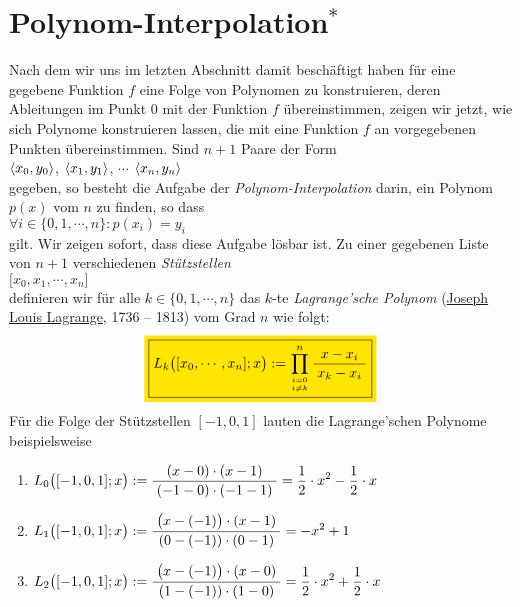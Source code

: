 \section{Polynom-Interpolation$^*$}
Nach dem wir uns im letzten Abschnitt damit besch\"aftigt haben f\"ur eine gegebene Funktion
$f$ eine Folge von Polynomen zu konstruieren, deren Ableitungen im Punkt $0$ mit der
Funktion $f$ \"ubereinstimmen, zeigen wir jetzt, wie sich Polynome konstruieren lassen, die
mit eine Funktion $f$ an vorgegebenen Punkten \"ubereinstimmen.  Sind $n+1$ Paare der Form
\\[0.2cm]
\hspace*{1.3cm}
$\pair(x_0,y_0)$,
$\pair(x_1,y_1)$,
$\cdots$
$\pair(x_n,y_n)$
\\[0.2cm]
gegeben, so besteht die Aufgabe der \emph{Polynom-Interpolation} darin, ein Polynom $p(x)$ vom  $n$ zu
finden, so dass
\\[0.2cm]
\hspace*{1.3cm}
$\forall i \in \{0,1,\cdots,n\}: p(x_i) = y_i$
\\[0.2cm]
gilt.  Wir zeigen sofort, dass diese Aufgabe l\"osbar ist.  Zu einer gegebenen Liste von 
$n+1$ verschiedenen \emph{St\"utzstellen} 
\\[0.2cm]
\hspace*{1.3cm}
$\bigl[x_0, x_1, \cdots, x_n]$
\\[0.2cm]
definieren wir f\"ur alle $k\in\{0,1,\cdots,n\}$ das $k$-te \emph{Lagrange'sche Polynom} 
(\href{http://de.wikipedia.org/wiki/Lagrange}{Joseph Louis Lagrange}, 1736 -- 1813)
vom Grad $n$ wie folgt: 
\begin{equation}
  \label{eq:lagrangePolynom}
\colorbox{orange}{\framebox{$\ds L_k\bigl([x_0,\cdots,x_n];x\bigr) := \prod\limits_{i=0 \atop i\not=k}^n \bruch{x-x_i}{x_k-x_i}$}}
\end{equation}
F\"ur die Folge der St\"utzstellen $[-1,0,1]$ lauten die Lagrange'schen Polynome beispielsweise
\begin{enumerate}
\item $L_0\bigl([-1,0,1];x\bigr) := \displaystyle\frac{\;\displaystyle(x-0)\cdot (x-1)\;}{\;\displaystyle(-1-0)\cdot (-1-1)\;} = 
       \frac{1}{2}\cdot x^2 - \frac{1}{2}\cdot x$ 
\item $L_1\bigl([-1,0,1];x\bigr) := \displaystyle\frac{\;\displaystyle\bigl(x-(-1)\bigr)\cdot (x-1)\;}{\;\displaystyle(0-(-1))\cdot (0-1)\;} = -x^2 + 1$
\item $L_2\bigl([-1,0,1];x\bigr) := \displaystyle\frac{\;\displaystyle\bigl(x-(-1)\bigr)\cdot (x-0)\;}{\;\displaystyle(1-(-1))\cdot (1-0)\;} = \frac{1}{2}\cdot x^2 + \frac{1}{2}\cdot x$
\end{enumerate}
